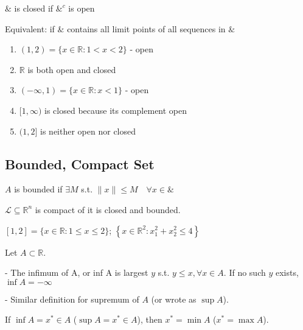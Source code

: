 \documentclass[11pt]{elegantbook}
\begin{document}
\begin{definition}
    $\&$ is closed if $\&^c$ is open

    Equivalent: if $\&$ contains all limit points of all sequences in $\&$
\end{definition}
\begin{example}
\end{example}
\begin{enumerate}[1)]
    \item $(1,2)=\{x \in \mathbb{R}: 1<x<2\}$ - open
    \item $\mathbb{R}$ is both open and closed
    \item $(-\infty, 1)=\{x \in \mathbb{R}: x<1\}$ - open
    \item $[1, \infty)$ is closed because its complement open
    \item $(1,2]$ is neither open nor closed
\end{enumerate}

\subsection{Bounded, Compact Set}
\begin{definition}
    $A$ is bounded if $\exists M$ s.t. $\|x\| \leqslant M \quad \forall x \in\&$
\end{definition}

\begin{definition}
    $\mathcal{L} \subseteq \mathbb{R}^{n}$ is compact of it is closed and bounded.
\end{definition}

\begin{example}
    $[1,2]=\{x \in \mathbb{R}: 1 \leqslant x \leqslant 2\}$; $\left\{x \in \mathbb{R}^{2}\right.: \left.x_{1}^{2}+x_{2}^{2} \leqslant 4\right\}$
\end{example}

\begin{definition}
    Let $A\subset \mathbb{R}$.

    - The infimum of A, or inf A is largest $y$ s.t. $y \leqslant x, \forall x \in A$. If no such $y$ exists, $\inf A=-\infty$

    - Similar definition for supremum of $A$ (or wrote as $\sup A$).
\end{definition}
\begin{proposition}
    If $\inf A=x^*\in A$ ($\sup A=x^*\in A$), then $x^*=\min A$ ($x^*=\max A$).
\end{proposition}
\end{document}

